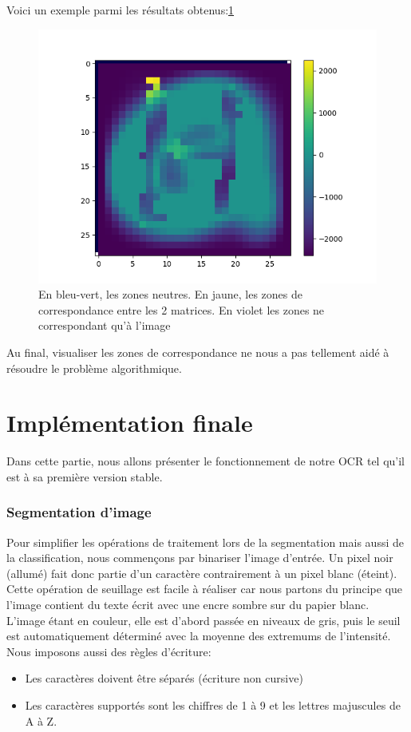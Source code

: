\documentclass[a4paper, 12pt]{article}
\begin{document}
Voici un exemple parmi les résultats obtenus:\ref{fig0}
\begin{figure}[!ht]
\centering
\includegraphics[scale=0.55]{img/pix_corc2.png}
\caption{En bleu-vert, les zones neutres. En jaune, les zones de correspondance entre les 2 matrices. En violet les zones ne correspondant qu'à l'image}
\label{fig0}
\end{figure}

Au final, visualiser les zones de correspondance ne nous a pas tellement aidé à résoudre le problème algorithmique.

\pagebreak
\part{Implémentation finale}
Dans cette partie, nous allons présenter le fonctionnement de notre OCR tel qu'il est à sa première version stable.

\section{Segmentation d'image}
Pour simplifier les opérations de traitement lors de la segmentation mais aussi de la classification, nous commençons par binariser l'image d'entrée. Un pixel noir (allumé) fait donc partie d'un caractère contrairement à un pixel blanc (éteint). Cette opération de seuillage est facile à réaliser car nous partons du principe que l'image contient du texte écrit avec une encre sombre sur du papier blanc. L'image étant en couleur, elle est d'abord passée en niveaux de gris, puis le seuil est automatiquement déterminé avec la moyenne des extremums de l'intensité. Nous imposons aussi des règles d'écriture:
\begin{itemize}
\item Les caractères doivent être séparés (écriture non cursive)
\item Les caractères supportés sont les chiffres de 1 à 9 et les lettres majuscules de A à Z.
\end{itemize}
\end{document}
